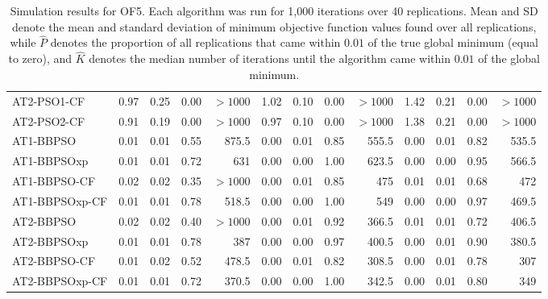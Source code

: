 \documentclass[cmbright]{staauth}
\numberwithin{table}{section}
\begin{document}
\begin{table}[ht]
\begin{tabular}{l|rrrr|rrrr|rrrr}
  AT2-PSO1-CF & 0.97 & 0.25 & 0.00 & $> 1000$ & 1.02 & 0.10 & 0.00 & $> 1000$ & 1.42 & 0.21 & 0.00 & $> 1000$ \\
  AT2-PSO2-CF & 0.91 & 0.19 & 0.00 & $> 1000$ & 0.97 & 0.10 & 0.00 & $> 1000$ & 1.38 & 0.21 & 0.00 & $> 1000$ \\
   \hline
AT1-BBPSO & 0.01 & 0.01 & 0.55 & 875.5 & 0.00 & 0.01 & 0.85 & 555.5 & 0.00 & 0.01 & 0.82 & 535.5 \\
  AT1-BBPSOxp & 0.01 & 0.01 & 0.72 & 631 & 0.00 & 0.00 & 1.00 & 623.5 & 0.00 & 0.00 & 0.95 & 566.5 \\
  AT1-BBPSO-CF & 0.02 & 0.02 & 0.35 & $> 1000$ & 0.00 & 0.01 & 0.85 & 475 & 0.01 & 0.01 & 0.68 & 472 \\
  AT1-BBPSOxp-CF & 0.01 & 0.01 & 0.78 & 518.5 & 0.00 & 0.00 & 1.00 & 549 & 0.00 & 0.00 & 0.97 & 469.5 \\
   \hline
AT2-BBPSO & 0.02 & 0.02 & 0.40 & $> 1000$ & 0.00 & 0.01 & 0.92 & 366.5 & 0.01 & 0.01 & 0.72 & 406.5 \\
  AT2-BBPSOxp & 0.01 & 0.01 & 0.78 & 387 & 0.00 & 0.00 & 0.97 & 400.5 & 0.00 & 0.01 & 0.90 & 380.5 \\
  AT2-BBPSO-CF & 0.01 & 0.02 & 0.52 & 478.5 & 0.00 & 0.01 & 0.82 & 308.5 & 0.00 & 0.01 & 0.78 & 307 \\
  AT2-BBPSOxp-CF & 0.01 & 0.01 & 0.72 & 370.5 & 0.00 & 0.00 & 1.00 & 342.5 & 0.00 & 0.01 & 0.80 & 349 \\
   \hline
\end{tabular}
\endgroup
\caption{Simulation results for OF5. Each algorithm was run for 1,000 iterations over 40 replications. Mean and SD denote the mean and standard deviation of minimum objective function values found over all replications, while $\widehat{P}$ denotes the proportion of all replications that came within $0.01$ of the true global minimum (equal to zero), and $\widehat{K}$ denotes the median number of iterations until the algorithm came within $0.01$ of the global minimum.}
\label{tab:psosim5}
\end{table}
\end{document}
